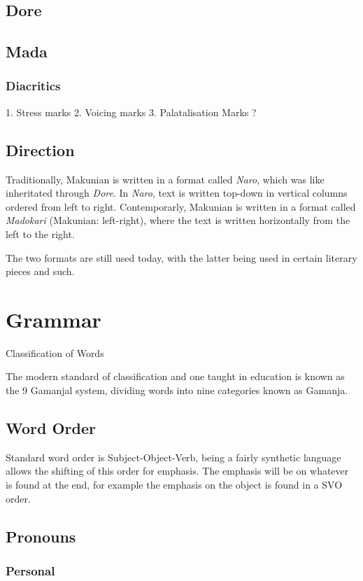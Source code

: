 \documentclass{article}
\begin{document}
    \subsection{Dore}
    \subsection{Mada}
    \subsubsection{Diacritics}
        1. Stress marks
        2. Voicing marks
        3. Palatalisation Marks ?

    \subsection{Direction}
    Traditionally, Makunian is written in a format called \emph{Naro}, which was like inheritated through \emph{Dore}. In \emph{Naro}, text is written top-down in vertical columns ordered from left to right. Contemporarly, Makunian is written in a format called \emph{Madokari} (Makunian: left-right), where the text is written horizontally from the left to the right. 

    The two formats are still used today, with the latter being used in certain literary pieces and such.
    
    \newpage
    \section{Grammar}
    Classification of Words 

    The modern standard of classification and one taught in education is known as the 9 Gamanjal system, dividing words into nine categories known as Gamanja.
    \subsection{Word Order}
    Standard word order is Subject-Object-Verb, being a fairly synthetic language allows the shifting of this order for emphasis. The emphasis will be on whatever is found at the end, for example the emphasis on the object is found in a SVO order.
    \subsection{Pronouns}

    \subsubsection{Personal}
\end{document}
